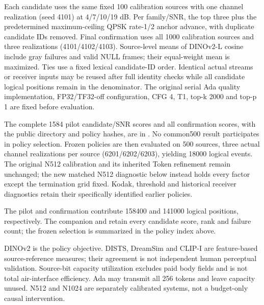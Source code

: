 \documentclass[10pt,letterpaper]{article}
\begin{document}
Each candidate uses the same fixed 100 calibration sources with one channel realization (seed 4101) at 4/7/10/19 dB. Per family/SNR, the top three plus the predetermined maximum-ceiling QPSK rate-1/2 anchor advance, with duplicate candidate IDs removed. Final confirmation uses all 1000 calibration sources and three realizations (4101/4102/4103). Source-level means of DINOv2-L cosine include gray failures and valid NULL frames; their equal-weight mean is maximized. Ties use a fixed lexical candidate-ID order. Identical actual streams or receiver inputs may be reused after full identity checks while all candidate logical positions remain in the denominator. The original serial Ada quality implementation, FP32/TF32-off configuration, CFG 4, T1, top-k 2000 and top-p 1 are fixed before evaluation.

The complete 1584 pilot candidate/SNR scores and all confirmation scores, with the public directory and policy hashes, are in . No common500 result participates in policy selection. Frozen policies are then evaluated on 500 sources, three actual channel realizations per source (6201/6202/6203), yielding 18000 logical events. The original N512 calibration and its inherited Token refinement remain unchanged; the new matched N512 diagnostic below instead holds every factor except the termination grid fixed. Kodak, threshold and historical receiver diagnostics retain their specifically identified earlier policies.

The pilot and confirmation contribute 158400 and 141000 logical positions, respectively. The companion  and  retain every candidate score, rank and failure count; the frozen selection is summarized in the policy index above.


DINOv2 is the policy objective. DISTS, DreamSim and CLIP-I are feature-based source-reference measures; their agreement is not independent human perceptual validation. Source-bit capacity utilization excludes paid body fields and is not total air-interface efficiency. Ada may transmit all 256 tokens and leave capacity unused. N512 and N1024 are separately calibrated systems, not a budget-only causal intervention.
\end{document}
